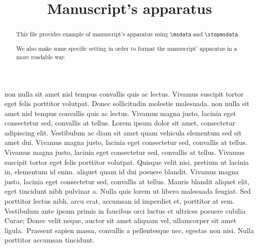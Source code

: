 \documentclass{article}
\begin{document}
\begin{english}
\title{Manuscript's apparatus}
\date{}
\maketitle

\begin{abstract}
This file provides example of manuscript's apparatus using \verb+\msdata+ and \verb+\stopmsdata+.

We also make some specific setting in order to format the manuscript' apparatus in a more readable way.
\end{abstract}
\end{english}

\beginnumbering
\autopar


 non nulla sit amet nisl tempus convallis quis ac lectus. Vivamus suscipit tortor eget felis porttitor volutpat. Donec sollicitudin molestie malesuada.  non nulla sit amet nisl tempus convallis quis ac lectus. Vivamus magna justo, lacinia eget consectetur sed, convallis at tellus. Lorem ipsum dolor sit amet, consectetur adipiscing elit. Vestibulum ac diam sit amet quam vehicula elementum sed sit amet dui. Vivamus magna justo, lacinia eget consectetur sed, convallis at tellus. Vivamus magna justo, lacinia eget consectetur sed, convallis at tellus. Vivamus suscipit tortor eget felis porttitor volutpat. Quisque velit nisi, pretium ut lacinia in, elementum id enim.  aliquet quam id dui posuere blandit. Vivamus magna justo, lacinia eget consectetur sed, convallis at tellus. Mauris blandit aliquet elit, eget tincidunt nibh pulvinar a. Nulla quis lorem ut libero malesuada feugiat. Sed porttitor lectus nibh.  arcu erat, accumsan id imperdiet et, porttitor at sem. Vestibulum ante ipsum primis in faucibus orci luctus et ultrices posuere cubilia Curae; Donec velit neque, auctor sit amet aliquam vel, ullamcorper sit amet ligula.\stopmsdata\  Praesent sapien massa, convallis a pellentesque nec, egestas non nisi. Nulla porttitor accumsan tincidunt.
\end{document}
